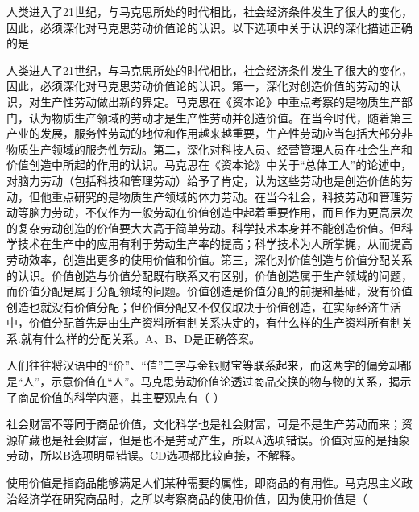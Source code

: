 \question 人类进入了21世纪，与马克思所处的时代相比，社会经济条件发生了很大的变化，因此，必须深化对马克思劳动价值论的认识。以下选项中关于认识的深化描述正确的是
\par{}
\begin{solution}人类进人了21世纪，与马克思所处的时代相比，社会经济条件发生了很大的变化，因此，必须深化对马克思劳动价值论的认识。第一，深化对创造价值的劳动的认识，对生产性劳动做出新的界定。马克思在《资本论》中重点考察的是物质生产部门，认为物质生产领域的劳动才是生产性劳动并创造价值。在当今时代，随着第三产业的发展，服务性劳动的地位和作用越来越重要，生产性劳动应当包括大部分非物质生产领域的服务性劳动。第二，深化对科技人员、经营管理人员在社会生产和价值创造中所起的作用的认识。马克思在《资本论》中关于``总体工人''的论述中，对脑力劳动（包括科技和管理劳动）给予了肯定，认为这些劳动也是创造价值的劳动，但他重点研究的是物质生产领域的体力劳动。在当今社会，科技劳动和管理劳动等脑力劳动，不仅作为一般劳动在价值创造中起着重要作用，而且作为更高层次的复杂劳动创造的价值要大大高于简单劳动。科学技术本身并不能创造价值。但科学技术在生产中的应用有利于劳动生产率的提高；科学技术为人所掌捤，从而提高劳动效率，创造出更多的使用价值和价值。第三，深化对价值创造与价值分配关系的认识。价值创造与价值分配既有联系又有区别，价值创造属于生产领域的问题，而价值分配是属于分配领域的问题。价值创造是价值分配的前提和基础，没有价值创造也就没有价值分配；但价值分配又不仅仅取决于价值创造，在实际经济生活中，价值分配首先是由生产资料所有制关系决定的，有什么样的生产资料所有制关系.就有什么样的分配关系。A、B、D是正确答案。
\end{solution}
\question 人们往往将汉语中的``价''、``值''二字与金银财宝等联系起来，而这两字的偏旁却都是``人''，示意价值在``人''。马克思劳动价值论透过商品交换的物与物的关系，揭示了商品价值的科学内涵，其主要观点有（
）
\par{}
\begin{solution}社会财富不等同于商品价值，文化科学也是社会财富，可是不是生产劳动而来；资源矿藏也是社会财富，但是也不是劳动产生，所以A选项错误。价值对应的是抽象劳动，所以B选项明显错误。CD选项都比较直接，不解释。
\end{solution}
\question 使用价值是指商品能够满足人们某种需要的属性，即商品的有用性。马克思主义政治经济学在研究商品时，之所以考察商品的使用价值，因为使用价值是（
